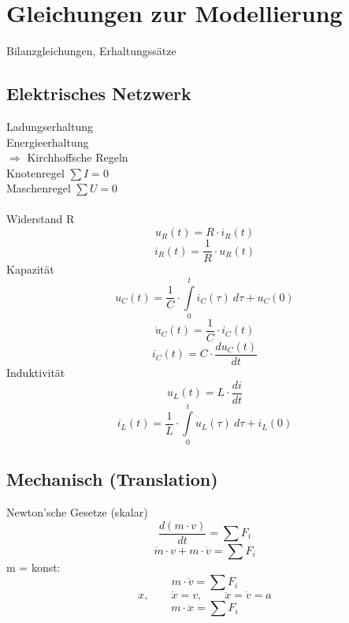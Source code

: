 



\section{Gleichungen zur Modellierung}
Bilanzgleichungen, Erhaltungssätze

\subsection{Elektrisches Netzwerk}
Ladungserhaltung \\
Energieerhaltung \\
$\Rightarrow$ Kirchhoffsche Regeln \\
Knotenregel $\sum I = 0$ \\
Maschenregel $\sum U = 0$ \\\\
Widerstand R
\[
    u_R(t) = R \cdot i_R(t)
\]
\[ 
    i_R(t) = \frac{1}{R} \cdot u_R(t)
\]
Kapazität
\[ 
    u_C(t) = \frac{1}{C} \cdot \int\limits_{0}^{t} i_C(\tau) ~ d\tau + u_C(0)
\]
\[
    \dot{u}_C(t) = \frac{1}{C} \cdot i_C(t)
\]
\[
    i_C(t) = C \cdot \frac{d u_C(t)}{d t}
\]
Induktivität
\[
    u_L(t) = L \cdot \frac{d i}{d t}
\]
\[
    i_L(t) = \frac{1}{L} \cdot \int\limits_{0}^{t} u_L(\tau) ~ d\tau + i_L(0)
\]

\subsection{Mechanisch (Translation)}
Newton'sche Gesetze (skalar)
\[
    \frac{d(m \cdot v)}{dt} = \sum F_i
\]
\[
    \dot{m} \cdot v + m \cdot \dot{v} = \sum F_i
\]
m = konst:
\[
    m \cdot \dot{v} = \sum F_i
\]
\[
    x, \qquad \dot{x} = v, \qquad \ddot{x} = \dot{v} = a
\]
\[
    m \cdot \ddot{x} = \sum F_i
\]

